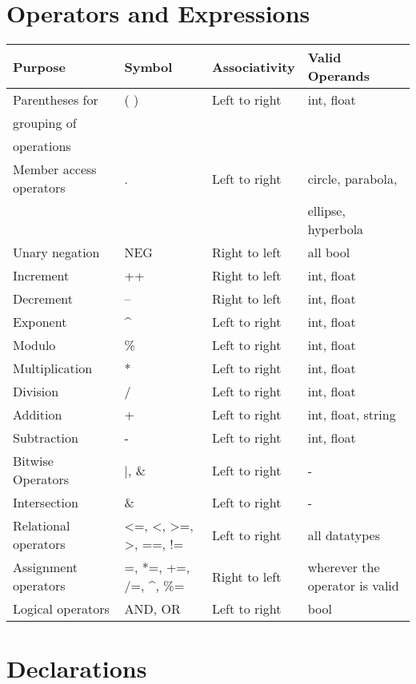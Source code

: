 \documentclass[12pt]{fphw}
\begin{document}
\section{Operators and Expressions}
\begin{table}[h]
\centering
\begin{tabular}{|l|l|l|l|}
\hline
Purpose & Symbol & Associativity & Valid Operands \\
\hline
Parentheses for & ( ) & Left to right & int, float \\
grouping of & & & \\
operations & & & \\
\hline
Member access operators & . & Left to right & circle, parabola, \\
&&&ellipse, hyperbola \\
\hline
Unary negation & NEG & Right to left & all bool \\
\hline
Increment & ++ & Right to left & int, float \\
\hline
Decrement & -- & Right to left & int, float \\
\hline
Exponent & \textasciicircum & Left to right & int, float \\
\hline
Modulo & \% & Left to right & int, float \\
\hline
Multiplication & * & Left to right & int, float \\
\hline
Division & / & Left to right & int, float \\
\hline
Addition & + & Left to right & int, float, string \\
\hline
Subtraction & - & Left to right & int, float \\
\hline
Bitwise Operators & |, \& & Left to right & - \\
\hline
Intersection & \& & Left to right & - \\
\hline
Relational operators & <=, <, >=, >, ==, != & Left to right & all datatypes \\
\hline
Assignment operators & =, *=, +=, /=, \^{}, \%= & Right to left & wherever the operator is valid \\
\hline
Logical operators & AND, OR & Left to right & bool \\
\hline
\end{tabular}
\end{table}

\section{Declarations}
\end{document}
